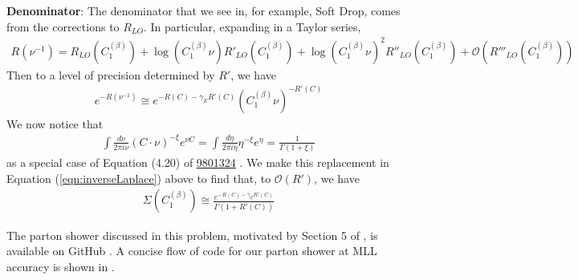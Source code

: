 \textbf{Denominator}:
The denominator that we see in, for example, Soft Drop, comes from the corrections to \(R_{LO}\). In particular, expanding in a Taylor series,
\begin{align}
    R(\nu^{-1}) = R_{LO}(C_1^{(\beta)}) + \log(C_1^{(\beta)} \nu) R'_{LO}(C_1^{(\beta)}) + \log(C_1^{(\beta)} \nu)^2 R''_{LO}(C_1^{(\beta)}) + \mathcal{O}(R'''_{LO}(C_1^{(\beta)}))
\end{align}
Then to a level of precision determined by \(R'\), we have
\begin{align}
    e^{-R(\nu^{-1})} \cong e^{-R(C) - \gamma_E R'(C)} (C_1^{(\beta)} \nu)^{-R'(C)}
\end{align}
We now notice that
\begin{align}
    \int \frac{d\nu}{2\pi i \nu} (C\cdot \nu)^{-\xi} e^{\nu C} = \int \frac{d\eta}{2\pi i \eta} \eta^{-\xi}e^\eta = \frac{1}{\Gamma(1 + \xi)}
\end{align}
as a special case of Equation (4.20) of \href{https://arxiv.org/pdf/hep-ph/9801324.pdf}{9801324} . We make this replacement in Equation (\ref{eqn:inverseLaplace}) above to find that, to \(\mathcal{O}(R')\), we have
\begin{align}
    \Sigma(C_1^{(\beta)}) \cong \frac{e^{-R(C) - \gamma_E R'(C)}}{\Gamma(1 + R'(C))}
\end{align}










The parton shower discussed in this problem, motivated by Section 5 of , is available on GitHub \cite{samgithub}.
%
A concise flow of code for our parton shower at MLL accuracy is shown in .

